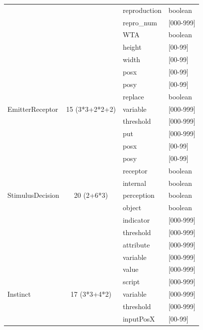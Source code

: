 \documentclass[11pt,twoside,a4paper]{article}
\begin{document}
\begin{table}[ht]
\begin{center}
\begin{scriptsize}
\begin{tabular}{|p{}|c|p{}|p{}|}
	\cline{3-4} %
								&				&	reproduction& boolean \\
	\cline{3-4} %
								&				&	repro\_num	& [000-999] \\
	\cline{3-4} %
								&				&	WTA			& boolean \\
	\cline{3-4} %
								&				&	height		& [00-99] \\
	\cline{3-4} %
								&				&	width		& [00-99] \\
	\cline{3-4} %
								&				&	posx		& [00-99] \\
	\cline{3-4} %
								&				&	posy		& [00-99] \\
	\cline{3-4} %
								&				&	replace		& boolean \\
	\hline \hline
	EmitterReceptor				& 15 (3*3+2*2+2)&	variable	& [000-999] \\
	\cline{3-4} %
								&				&	threshold	& [000-999] \\
	\cline{3-4} %
								&				&	put			& [000-999] \\
	\cline{3-4} %
								&				&	posx		& [00-99] \\
	\cline{3-4} %
								&				&	posy		& [00-99] \\
	\cline{3-4} %
								&				&	receptor	& boolean \\
	\cline{3-4} %
								&				&	internal	& boolean	\\
	\hline \hline
	StimulusDecision			&	20 (2+6*3)	&	perception	& boolean \\
	\cline{3-4} %
								&				&	object		& boolean \\
	\cline{3-4} %
								&				&	indicator	& [000-999] \\
	\cline{3-4} %
								&				&	threshold	& [000-999] \\
	\cline{3-4} %
								&				&	attribute	& [000-999] \\
	\cline{3-4} %
								&				&	variable	& [000-999] \\
	\cline{3-4} %
								&				&	value		& [000-999] \\
	\cline{3-4} %
								&				&	script		& [000-999] \\
	\hline \hline
	Instinct					&	17 (3*3+4*2)&	variable	& [000-999] \\
	\cline{3-4} %
								&				&	threshold	& [000-999] \\
	\cline{3-4} %
								&				&	inputPosX	& [00-99] \\

\end{tabular}
\end{scriptsize}
\end{center}
\end{table}
\end{document}
